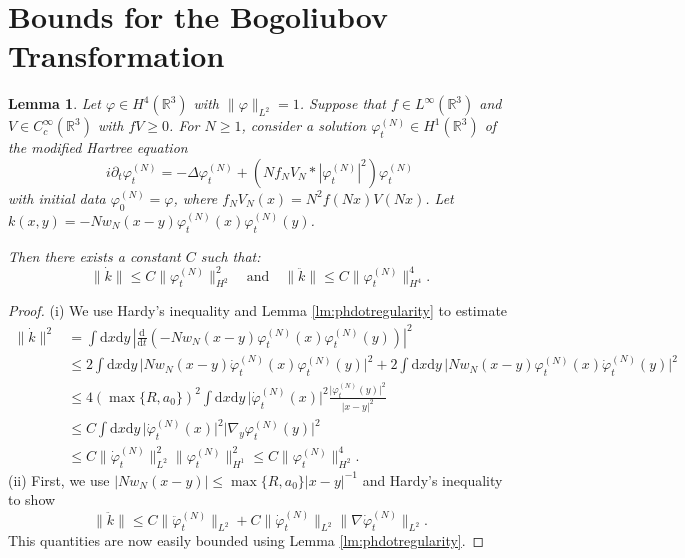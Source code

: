 \documentclass[11pt,a4paper,draft,DIV11]{scrartcl}	%
\newtheorem{lem}[thm]{Lemma}
\newcommand{\R}{\mathds{R}}
\newcommand{\di}{\textrm{d}}		%
\newcommand{\norm}[1]{\lVert#1\rVert}	%
\newcommand{\ph}{\varphi_t^{(N)}}	%
\newcommand{\phdot}{\dot{\varphi}_t^{(N)}}	%
\newcommand{\phddot}{\ddot{\varphi}_t^{(N)}}	%
\newcommand{\bd}{\begin{displaymath}}			%
\newcommand{\ed}{\end{displaymath}}
\begin{document}
\section{Bounds for the Bogoliubov Transformation}
\label{s:bogbounds}
%
\begin{lem} \label{lm:kbounds}
Let $\varphi \in H^4(\R^3)$ with $\| \varphi \|_{L^2} = 1$. Suppose that
  $f \in L^\infty(\R^3)$ and $V \in C_c^\infty(\R^3)$ with $fV \ge 0$. For $N \ge
  1$, consider a solution $\varphi_t^{(N)} \in H^1(\R^3)$ of the modified
  Hartree equation
  \[
    i \partial_t \varphi_t^{(N)} = - \Delta \varphi_t^{(N)} + (N f_N V_N *
    |\varphi_t^{(N)}|^2) \varphi_t^{(N)}
  \]
  with initial data $\varphi^{(N)}_0 = \varphi$, where $f_N V_N(x) = N^2
  f(Nx)V(Nx)$. Let $k(x,y) = -N w_N(x-y) \ph(x) \ph(y)$.

Then there exists a constant $C$ such that:
\bd
\norm{\dot k} \leq C \norm{\ph}_{H^2}^2
 \quad \mbox{and} \quad
\norm{\ddot k} \leq C \norm{\ph}_{H^4}^4.
\ed
\end{lem}
\begin{proof} (i) We use Hardy's inequality and Lemma \ref{lm:phdotregularity} to estimate
\begin{align*}
\norm{\dot k}^2 & = \int \di x\di y\, \left\lvert \frac{\di}{\di t} \left( -N w_N(x-y) \ph(x)\ph(y) \right) \right\rvert^2 \\
& \leq 2 \int \di x\di y\, \lvert N w_N(x-y) \phdot(x) \ph(y) \rvert^2 + 2 \int \di x \di y\, \lvert N w_N(x-y) \ph(x) \phdot(y) \rvert^2 \\
& \leq 4 \left( \max\{R,a_0\} \right)^2 \int \di x\di y\, \lvert \phdot(x)\rvert^2 \frac{\lvert\ph(y)\rvert^2}{\lvert x-y\rvert^2} \\
& \leq C \int \di x\di y\, \lvert \phdot(x)\rvert^2 \lvert \nabla_y \ph(y)\rvert^2 \\
& \leq C \norm{\phdot}_{L^2}^2 \norm{\ph}_{H^1}^2 \leq C \norm{\ph}_{H^2}^4.
\end{align*}
(ii) First, we use $\lvert N w_N(x-y) \rvert \leq \max \{R,a_0\} \lvert x-y\rvert^{-1}$ and Hardy's inequality to show
\bd
\norm{\ddot k} \leq C \norm{\phddot}_{L^2} + C \norm{\phdot}_{L^2} \norm{\nabla \phdot}_{L^2}.
\ed
This quantities are now easily bounded using Lemma \ref{lm:phdotregularity}.
\end{proof}
\end{document}
